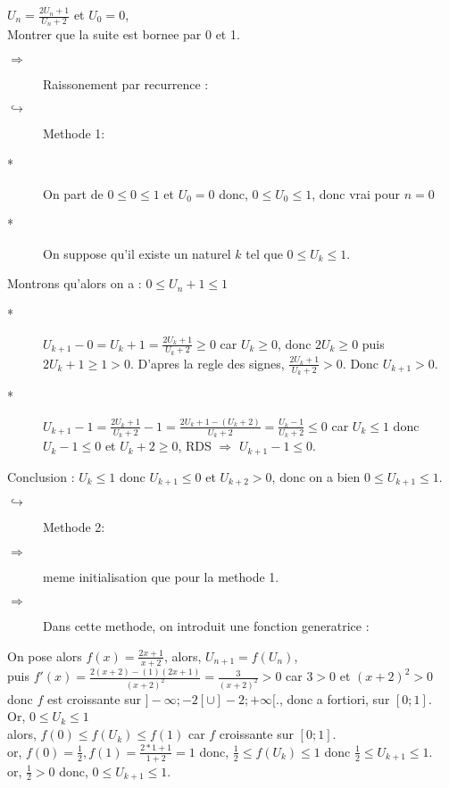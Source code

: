 \documentclass[a4paper,10pt]{book}
\begin{document}
	\exemple
	$U_{n} = \frac{2U_{n}+1}{U_{n}+2}$ et $U_{0} = 0$,\\
	Montrer que la suite est bornee par 0 et 1.
	\begin{description}
	\item [$\Rightarrow$] Raissonement par recurrence :
	\end{description}
	\begin{description}
	\item [   $\hookrightarrow$] Methode 1:
	\end{description}
		\begin{description}
			\item [*] On part de $0 \leq 0 \leq 1$ et $U_{0} = 0$ donc, $0 \leq U_{0} \leq 1$, donc vrai pour $n = 0$
			\item [*] On suppose qu'il existe un naturel $k$ tel que $0 \leq U_{k} \leq 1$.
		\end{description}
		Montrons qu'alors on a : $0 \leq U_n+1 \leq 1$
		\begin{description}
			\item [*] $U_{k+1} - 0 = U_k+1 = \frac{2U_k+1}{U_k + 2} \geq 0$ car $U_k \geq 0$, donc $2U_k \geq 0$ puis $2U_k + 1 \geq 1 > 0$. D'apres la regle des signes, $\frac{2U_k+1}{U_k + 2} > 0$. Donc $U_{k+1} > 0$.
			\item [*] $U_{k+1} - 1 = \frac{2U_k+1}{U_k + 2} - 1 = \frac{2U_k+1 - (U_k + 2)}{U_k + 2} = \frac{U_k - 1}{U_k + 2} \leq 0$ car $U_k \leq 1$ donc $U_k - 1 \leq 0$ et $U_k + 2 \geq 0$, RDS $\Rightarrow$ $U_{k+1} - 1\leq 0$.
		\end{description}
		Conclusion : $U_k \leq 1$ donc $U_{k+1} \leq 0$ et $U_{k+2} > 0$, donc on a bien $0 \leq U_{k+1} \leq 1$.
		\smallskip
		\begin{description}
		\item [   $\hookrightarrow$] Methode 2:
		\end{description}
		\begin{description}
			\item[$\Rightarrow$] meme initialisation que pour la methode 1.
			\item[$\Rightarrow$] Dans cette methode, on introduit une fonction generatrice :
		\end{description}
		On pose alors $f(x) = \frac{2x+1}{x+2}$, alors, $U_{n+1} = f(U_n)$,\\
		puis $f'(x)=\frac{2(x+2)-(1)(2x+1)}{(x+2)^2}=\frac{3}{(x+2)^2} > 0$ car $3>0$ et $(x+2)^2 > 0$ donc $f$ est croissante sur $]-\infty;-2[\cup]-2;+\infty[.$, donc a fortiori, sur $[0;1]$.\\
		Or, $0 \leq U_k \leq 1$\\
		alors, $f(0) \leq f(U_k) \leq f(1)$ car $f$ croissante sur $[0;1]$.\\
		or, $f(0) = \frac{1}{2},f(1) = \frac{2*1 + 1}{1 + 2} = 1$
		donc, $\frac{1}{2} \leq f(U_k) \leq 1$ donc $\frac{1}{2} \leq U_{k+1} \leq 1$.\\
		or, $\frac{1}{2} > 0$ donc, $0 \leq U_{k+1} \leq 1$.
\end{document}
